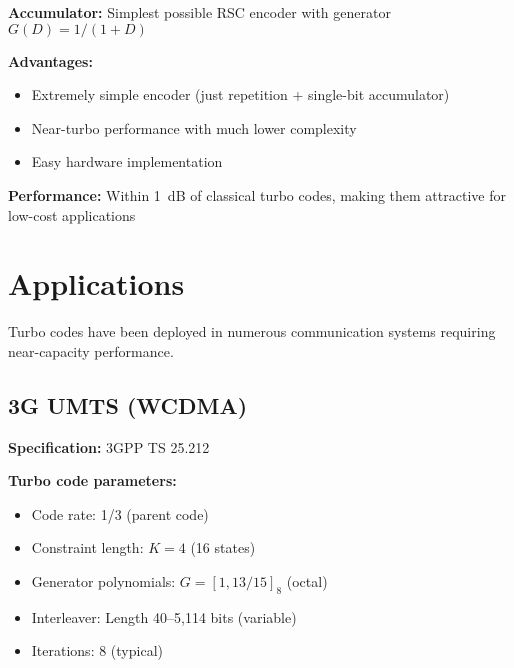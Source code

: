 \begin{center}
\end{center}

\textbf{Accumulator:} Simplest possible RSC encoder with generator $G(D) = 1/(1+D)$

\textbf{Advantages:}
\begin{itemize}
\item Extremely simple encoder (just repetition + single-bit accumulator)
\item Near-turbo performance with much lower complexity
\item Easy hardware implementation
\end{itemize}

\textbf{Performance:} Within 1~dB of classical turbo codes, making them attractive for low-cost applications

\section{Applications}

Turbo codes have been deployed in numerous communication systems requiring near-capacity performance.

\subsection{3G UMTS (WCDMA)}

\textbf{Specification:} 3GPP TS 25.212

\textbf{Turbo code parameters:}
\begin{itemize}
\item Code rate: 1/3 (parent code)
\item Constraint length: $K = 4$ (16 states)
\item Generator polynomials: $G = [1, 13/15]_8$ (octal)
\item Interleaver: Length 40--5,114 bits (variable)
\item Iterations: 8 (typical)
\end{itemize}

